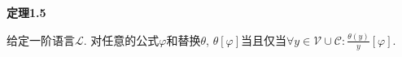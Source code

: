 




\newpage




\hypertarget{sec:定理1.5}{}
\noindent\textbf{定理1.5}

给定一阶语言$\mathcal{L}$. 对任意的公式$\varphi$和替换$\theta$,
$\theta[\varphi]$当且仅当$\displaystyle\forall y\in\mathcal{V}\cup\mathcal{C}:
\frac{\theta(y)}{y}[\varphi]$.



